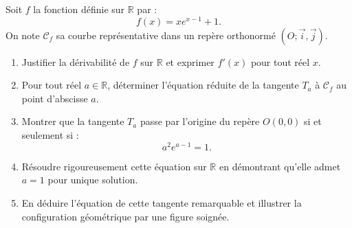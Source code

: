 \documentclass[11pt,a4paper]{article}
\newcommand{\R}{\mathbb{R}}
\begin{document}
Soit $f$ la fonction définie sur $\R$ par :
\[
f(x) = x e^{x-1} + 1.
\]
On note $\mathcal{C}_f$ sa courbe représentative dans un repère orthonormé $(O; \vec{i}, \vec{j})$.
\begin{enumerate}[label=\textbf{\arabic*.}]
    \item Justifier la dérivabilité de $f$ sur $\R$ et exprimer $f'(x)$ pour tout réel $x$.
    \item Pour tout réel $a \in \R$, déterminer l'équation réduite de la tangente $T_a$ à $\mathcal{C}_f$ au point d'abscisse $a$.
    \item Montrer que la tangente $T_a$ passe par l'origine du repère $O(0, 0)$ si et seulement si :
    \[
    a^2 e^{a-1} = 1.
    \]
    \item Résoudre rigoureusement cette équation sur $\R$ en démontrant qu'elle admet $a = 1$ pour unique solution.
    \item En déduire l'équation de cette tangente remarquable et illustrer la configuration géométrique par une figure soignée.
\end{enumerate}
\end{document}
